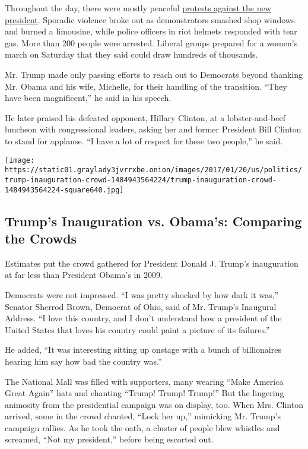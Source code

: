Throughout the day, there were mostly peaceful
\href{https://www.nytimes3xbfgragh.onion/2017/01/20/us/politics/inauguration-protests.html}{protests
against the new president}. Sporadic violence broke out as demonstrators
smashed shop windows and burned a limousine, while police officers in
riot helmets responded with tear gas. More than 200 people were
arrested. Liberal groups prepared for a women's march on Saturday that
they said could draw hundreds of thousands.

Mr. Trump made only passing efforts to reach out to Democrats beyond
thanking Mr. Obama and his wife, Michelle, for their handling of the
transition. ``They have been magnificent,'' he said in his speech.

He later praised his defeated opponent, Hillary Clinton, at a
lobster-and-beef luncheon with congressional leaders, asking her and
former President Bill Clinton to stand for applause. ``I have a lot of
respect for these two people,'' he said.

\href{https://www.nytimes3xbfgragh.onion/interactive/2017/01/20/us/politics/trump-inauguration-crowd.html}{}

\texttt{[image: https://static01.graylady3jvrrxbe.onion/images/2017/01/20/us/politics/trump-inauguration-crowd-1484943564224/trump-inauguration-crowd-1484943564224-square640.jpg]}

\hypertarget{trumps-inauguration-vs-obamas-comparing-the-crowds}{%
\subsection{Trump's Inauguration vs. Obama's: Comparing the
Crowds}\label{trumps-inauguration-vs-obamas-comparing-the-crowds}}

Estimates put the crowd gathered for President Donald J. Trump's
inauguration at far less than President Obama's in 2009.

Democrats were not impressed. ``I was pretty shocked by how dark it
was,'' Senator Sherrod Brown, Democrat of Ohio, said of Mr. Trump's
Inaugural Address. ``I love this country, and I don't understand how a
president of the United States that loves his country could paint a
picture of its failures.''

He added, ``It was interesting sitting up onstage with a bunch of
billionaires hearing him say how bad the country was.''

The National Mall was filled with supporters, many wearing ``Make
America Great Again'' hats and chanting ``Trump! Trump! Trump!'' But the
lingering animosity from the presidential campaign was on display, too.
When Mrs. Clinton arrived, some in the crowd chanted, ``Lock her up,''
mimicking Mr. Trump's campaign rallies. As he took the oath, a cluster
of people blew whistles and screamed, ``Not my president,'' before being
escorted out.

